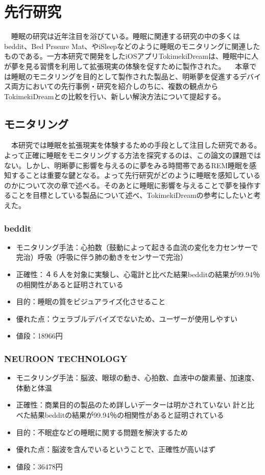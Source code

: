 \chapter{先行研究}
\label{chap:search}

　睡眠の研究は近年注目を浴びている。睡眠に関連する研究の中の多くはbeddit、Bed Prssure Mat、やiSleepなどのように睡眠のモニタリングに関連したものである。一方本研究で開発をしたiOSアプリTokimekiDreamは、睡眠中に人が夢を見る習慣を利用して拡張現実の体験を促すために製作された。
　本章では睡眠のモニタリングを目的として製作された製品と、明晰夢を促進するデバイス両方においての先行事例・研究を紹介しのちに、複数の観点からTokimekiDreamとの比較を行い、新しい解決方法について提起する。

\section{モニタリング}
　本研究では睡眠を拡張現実を体験するための手段として注目した研究である。よって正確に睡眠をモニタリングする方法を探究するのは、この論文の課題ではない。しかし、明晰夢に影響を与えるのに夢をみる時間帯であるREM睡眠を感知することは重要な鍵となる。よって先行研究がどのように睡眠を感知しているのかについて次の章で述べる。そのあとに睡眠に影響を与えることで夢を操作することを目標としている製品について述べ、TokimekiDreamの参考にしたいと考えた。

\subsection{beddit}
\begin{itemize}
\item モニタリング手法：心拍数（鼓動によって起きる血流の変化を力センサーで完治）呼吸（呼吸に伴う肺の動きをセンサーで完治）\cite{beddit}
\item 正確性：４６人を対象に実験し、心電計と比べた結果bedditの結果が99.94％の相関性があると証明されている
\item 目的：睡眠の質をビジュアライズ化させること
\item 優れた点：ウェラブルデバイズでないため、ユーザーが使用しやすい
\item 値段：18966円
\end{itemize}

\subsection{NEUROON TECHNOLOGY}
\begin{itemize}
\item モニタリング手法：脳波、眼球の動き、心拍数、血液中の酸素量、加速度、体動と体温 \cite{neuroon}
\item 正確性：商業目的の製品のため詳しいデーターは明かされていない
計と比べた結果bedditの結果が99.94％の相関性があると証明されている
\item 目的：不眠症などの睡眠に関する問題を解決するため
\item 優れた点：脳波を含んでいるということで、正確性が高いはず
\item 値段：36478円
\end{itemize}


